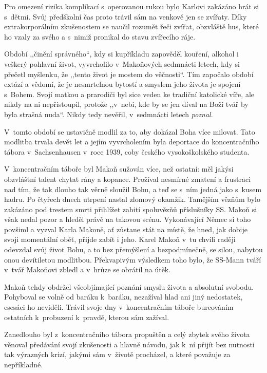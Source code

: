 Pro omezení rizika komplikací s~operovanou rukou bylo Karlovi zakázáno hrát si
s~dětmi. Svůj předškolní čas proto trávil sám na venkově jen se zvířaty. Díky
extrakorporálním zkušenostem se naučil rozumět řeči zvířat, obzvláště hus, které
ho vzaly za svého a s~nimiž pronikal do stavu zvířecího ráje.

Období ,,činění správného``, kdy si kupříkladu zapověděl kouření, alkohol i
veškerý pohlavní život, vyvrcholilo v~Makoňových sedmnácti letech, kdy si
přečetl myšlenku, že ,,tento život je mostem do věčnosti``. Tím započalo období
extází a vědomí, že je nesmrtelnou bytostí a smyslem jeho života je spojení
s~Bohem. Svojí matkou a prarodiči byl sice veden ke tradiční katolické víře, ale
nikdy na ni nepřistoupil, protože ,,v~nebi, kde by se jen díval na Boží tvář by
byla strašná nuda``. Nikdy tedy nevěřil, v~sedmnácti letech {\em poznal}.

V~tomto období se ustavičně modlil za to, aby dokázal Boha více milovat. Tato
modlitba trvala devět let a jejím vyvrcholením byla deportace do koncentračního
tábora v~Sachsenhausen v~roce 1939, coby českého vysokoškolského studenta.

V~koncentračním táboře byl Makoň sužován více, než ostatní: měl jakýsi
obzvláštní talent chytat rány a kopance. Prožíval nesmírné zmatení a frustraci
nad tím, že tak dlouho tak věrně sloužil Bohu, a teď se s~ním jedná jako s~kusem
hadru. Po čtyřech dnech utrpení nastal zlomový okamžik. Tamějším vězňům bylo
zakázáno pod trestem smrti přihlížet zabití spoluvězňů příslušníky SS. Makoň si
však nedal pozor a hleděl právě na takovou scénu. Vykonávající Němec si toho
povšiml a vyzval Karla Makoně, ať zůstane stát na místě, že hned, jak dobije
svoji momentální oběť, přijde zabít i jeho. Karel Makoň v~tu chvíli raději
odevzdal svůj život Bohu, a to bez přemýšlení a bezpodmínečně, se silou, nabytou
onou devítiletou modlitbou. Překvapivým výsledkem toho bylo, že SS-Mann tváří
v~tvář Makoňovi zbledl a v~hrůze se obrátil na útěk.

Makoň tehdy obdržel všeobjímající poznání smyslu života
a absolutní svobodu. Pohyboval se volně od baráku k~baráku, nezažíval hlad ani
jiný nedostatek, esesáci ho neviděli. Trávil svoje dny v~koncentračním táboře
burcováním ostatních k~probuzení k~pravdě, kterou sám zažíval.

Zanedlouho byl z~koncentračního tábora propuštěn a celý zbytek svého života
věnoval předávání svojí zkušenosti a hlavně návodu, jak k~ní přijít bez nutnosti
tak výrazných krizí, jakými sám v~životě procházel, a které považuje za
nepříkladné.

